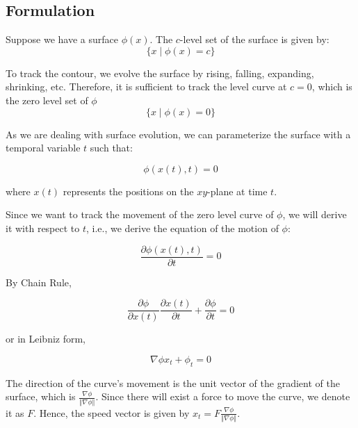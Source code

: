 \documentclass[12pt, letter]{article}
\begin{document}
\subsection{Formulation}
Suppose we have a surface $\phi(x)$. The $c$-level set of the surface is given by:
\begin{equation}
    \{x \mid \phi(x) = c\}
\end{equation}

To track the contour, we evolve the surface by rising, falling, expanding, shrinking, etc. Therefore, it is sufficient to track the level curve at $c = 0$, which is the zero level set of $\phi$
\begin{equation}
    \{x \mid \phi(x) = 0\}
\end{equation}

As we are dealing with surface evolution, we can parameterize the surface with a temporal variable $t$ such that:

\begin{equation}
    \phi(x(t), t) = 0
\end{equation}{}

where $x(t)$ represents the positions on the $xy$-plane at time $t$.

Since we want to track the movement of the zero level curve of $\phi$, we will derive it with respect to $t$, i.e., we derive the equation of the motion of $\phi$:

\begin{equation}
    \frac{\partial \phi(x(t), t)}{\partial t} = 0
\end{equation}

By Chain Rule,

\begin{equation}
    \frac{\partial \phi}{\partial x(t)} \frac{\partial x(t)}{\partial t} + \frac{\partial \phi}{\partial t} = 0
\end{equation}

or in Leibniz form,

\begin{equation}
    \nabla \phi x_t + \phi_t = 0
\end{equation}

The direction of the curve's movement is the unit vector of the gradient of the surface, which is $\frac{\nabla \phi}{\left\Vert \nabla \phi \right\Vert}$. Since there will exist a force to move the curve, we denote it as $F$. Hence, the speed vector is given by $x_t = F \frac{\nabla \phi}{\left\Vert \nabla \phi \right\Vert}$.
\end{document}
